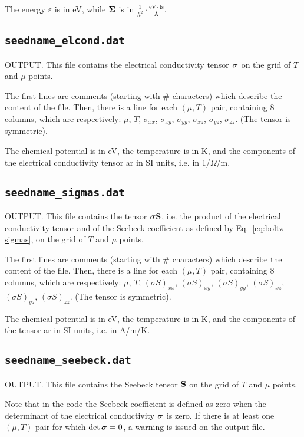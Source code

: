 The energy $\varepsilon$ is in eV, while $\bm{\mathrm{\Sigma}}$ is in
 $\displaystyle\frac{1}{\hbar^2}\cdot\frac{\mathrm{eV}\cdot\mathrm{fs}}{\text{\AA}}$.

\subsection{{\tt seedname\_elcond.dat}}
OUTPUT. This file contains the electrical conductivity tensor $\bm{\mathrm{\sigma}}$ on the grid of $T$ and $\mu$ points.

The first lines are comments (starting with \# characters) which describe the content of the file.
Then, there is a line for each $(\mu,T)$ pair, containing 8 columns, which are respectively: $\mu$, $T$, $\sigma_{xx}$, $\sigma_{xy}$, $\sigma_{yy}$, $\sigma_{xz}$, $\sigma_{yz}$, $\sigma_{zz}$. (The tensor is symmetric).

The chemical potential is in eV, the temperature is in K, and the components of the electrical conductivity tensor ar in SI units, i.e. in 1/$\Omega$/m.

\subsection{{\tt seedname\_sigmas.dat}}
OUTPUT. This file contains the tensor $\bm{\mathrm{\sigma}}\bm{\mathrm{S}}$, i.e. the product of the electrical conductivity tensor and of the Seebeck coefficient as defined by Eq.~\eqref{eq:boltz-sigmas}, on the grid of $T$ and $\mu$ points.

The first lines are comments (starting with \# characters) which describe the content of the file.
Then, there is a line for each $(\mu,T)$ pair, containing 8 columns, which are respectively: $\mu$, $T$, $(\sigma S)_{xx}$, $(\sigma S)_{xy}$, $(\sigma S)_{yy}$, $(\sigma S)_{xz}$, $(\sigma S)_{yz}$, $(\sigma S)_{zz}$. (The tensor is symmetric).

The chemical potential is in eV, the temperature is in K, and the components of the tensor ar in SI units, i.e. in A/m/K.

\subsection{{\tt seedname\_seebeck.dat}}
OUTPUT. This file contains the Seebeck tensor $\bm{\mathrm{S}}$ on the grid of $T$ and $\mu$ points.

Note that in the code the Seebeck coefficient is defined as zero when the determinant of the electrical conductivity $\bm{\mathrm{\sigma}}$ is zero. If there is at least one $(\mu, T)$ pair for which $\det \bm{\mathrm{\sigma}}=0$, a warning is issued on the output file.

